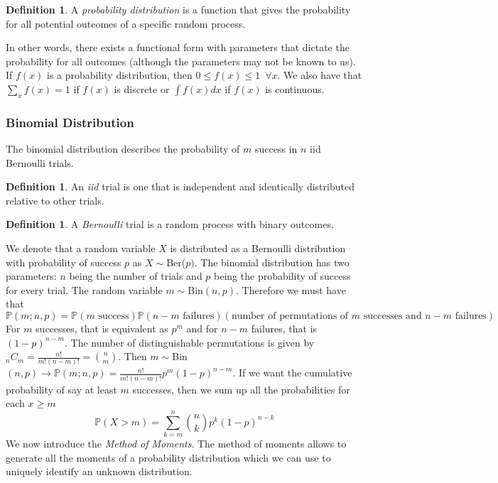\documentclass{article}
\newcommand{\p}{\mathbb{P}}
\theoremstyle{definition}
\newtheorem{definition}[theorem]{Definition}
\begin{document}
\begin{definition}
    A \emph{probability distribution} is a function that gives the probability for all potential outcomes of a specific random process.
\end{definition}
In other words, there exists a functional form with parameters that dictate the probability for all outcomes (although the parameters may not be known to us). If $f(x)$ is a probability distribution, then $0\leq f(x)\leq 1 \,\,\, \forall x$. We also have that $\displaystyle{\sum_x}f(x)=1$ if $f(x)$ is discrete or $\displaystyle{\int f(x)dx}$ if $f(x)$ is continuous.
\subsubsection{Binomial Distribution}
The binomial distribution describes the probability of $m$ success in $n$ iid Bernoulli trials. 
\begin{definition}
    An \emph{iid} trial is one that is independent and identically distributed relative to other trials.
\end{definition}
\begin{definition}
    A \emph{Bernoulli} trial is a random process with binary outcomes.
\end{definition}
We denote that a random variable $X$ is distributed as a Bernoulli distribution with probability of success $p$ as $X \sim $Ber($p)$. The binomial distribution has two parameters: $n$ being the number of trials and $p$ being the probability of success for every trial. The random variable $m \sim $Bin$(n,p)$. Therefore we must have that 
\begin{equation*}
    \p(m;n,p) = \p(m \text{ success})\p(n-m\text{ failures})(\text{number of permutations of }m\text{ successes and }n-m \text{ failures})
\end{equation*}
For $m$ successes, that is equivalent as $p^m$ and  for $n-m$ failures, that is $(1-p)^{n-m}$. The number of distinguishable permutations is given by $_nC_m = \frac{n!}{m!(n-m)!} = \binom{n}{m}$. Then $m\sim $Bin$(n,p) \to \p(m;n,p) = \frac{n!}{m!(n-m)!}p^m(1-p)^{n-m}$. If we want the cumulative probability of say at least $m$ successes, then we sum up all the probabilities for each $x\geq m$
\begin{equation*}
    \p(X>m) = \sum^n_{k=m}\binom{n}{k} p^k(1-p)^{n-k}
\end{equation*}
We now introduce the \emph{Method of Moments}. The method of moments allows to generate all the moments of a probability distribution which we can use to uniquely identify an unknown distribution.
\end{document}
